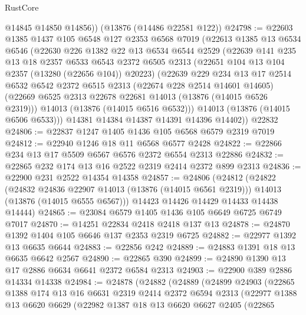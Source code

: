 \begin{lexlean}{RustCore}
\begin{coremodule}
        @14845
        @14850
        @14856))
    (@13876 (@14486 @22581 @122))
@24798 := @22603
    @1385
    @1437
    @105
    @6548
    @127
    @2353
    @6568
    @7019
    (@22613
      @1385
      @13
      @6534
      @6546
      (@22630
        @226
        @1382
        @22
        @13
        @6534
        @6544
        @2529
        (@22639
          @141
          @235
          @13
          @18
          @2357
          @6533
          @6543
          @2372
          @6505
          @2313
          (@22651 @104 @13 @104 @2357 (@13280 (@22656 @104)) @20223)
          (@22639
            @229
            @234
            @13
            @17
            @2514
            @6532
            @6542
            @2372
            @6515
            @2313
            (@22674 @228 @2514 @14601 @14605)
            (@22669 @6525 @2313 @22678 @22681 @14013 (@13876 (@14015 @6526 @2319)))
            @14013
            (@13876 (@14015 @6516 @6532)))
          @14013
          (@13876 (@14015 @6506 @6533)))
        @14381
        @14384
        @14387
        @14391
        @14396
        @14402))
    @22832
@24806 := @22837 @1247 @1405 @1436 @105 @6568 @6579 @2319 @7019
@24812 := @22940 @1246 @18 @11 @6568 @6577 @2428
@24822 := @22866 @234 @13 @17 @5509 @6567 @6576 @2372 @6554 @2313 @22886
@24832 := @22865 @232 @174 @13 @16 @2522 @2319 @2414 @2372 @899 @2313
@24836 := @22900 @231 @2522 @14354 @14358
@24857 := @24806
    (@24812
      (@24822
        (@24832 @24836 @22907 @14013 (@13876 (@14015 @6561 @2319)))
        @14013
        (@13876 (@14015 @6555 @6567)))
      @14423
      @14426
      @14429
      @14433
      @14438
      @14444)
@24865 := @23084 @6579 @1405 @1436 @105 @6649 @6725 @6749 @7017
@24870 := @14251 @22834 @2418 @2418 @137 @13
@24878 := @24870 @1392 @1404 @105 @6646 @137 @2353 @2319 @6725
@24882 := @22977 @1392 @13 @6635 @6644
@24883 := @22856 @242
@24889 := @24883 @1391 @18 @13 @6635 @6642 @2567
@24890 := @22865 @390
@24899 := @24890 @1390 @13 @17 @2886 @6634 @6641 @2372 @6584 @2313
@24903 := @22900 @389 @2886 @14334 @14338
@24984 := @24878
    (@24882
      (@24889
        (@24899
          @24903
          (@22865
            @1388
            @174
            @13
            @16
            @6631
            @2319
            @2414
            @2372
            @6594
            @2313
            (@22977
              @1388
              @13
              @6620
              @6629
              (@22982
                @1387
                @18
                @13
                @6620
                @6627
                @2405
                (@22865

\end{coremodule}
\end{lexlean}
